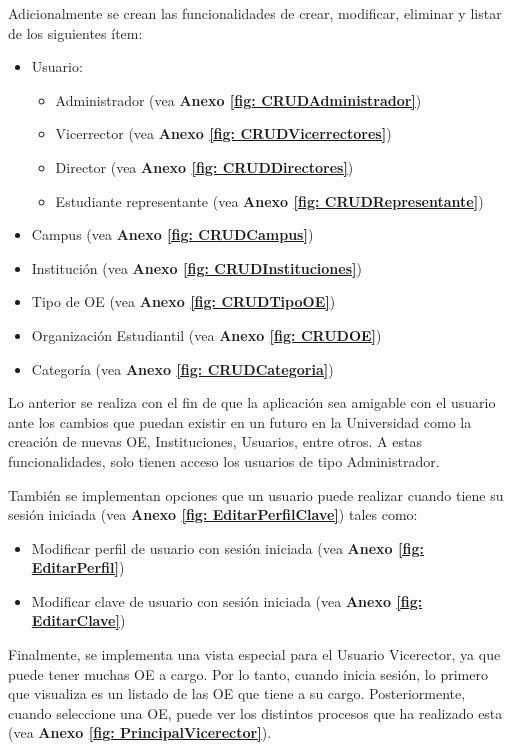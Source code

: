 Adicionalmente se crean las funcionalidades de crear, modificar, eliminar y listar de los siguientes ítem:
\begin{itemize}
    \item Usuario:
    \begin{itemize}
        \item Administrador (vea \textbf{Anexo \ref{fig: CRUDAdministrador}})
        \item Vicerrector (vea \textbf{Anexo \ref{fig: CRUDVicerrectores}})
        \item Director (vea \textbf{Anexo \ref{fig: CRUDDirectores}})
        \item Estudiante representante (vea \textbf{Anexo \ref{fig: CRUDRepresentante}})
    \end{itemize}
    \item Campus (vea \textbf{Anexo \ref{fig: CRUDCampus}})    
    \item Institución (vea \textbf{Anexo \ref{fig: CRUDInstituciones}})    
    \item Tipo de OE (vea \textbf{Anexo \ref{fig: CRUDTipoOE}})
    \item Organización Estudiantil (vea \textbf{Anexo \ref{fig: CRUDOE}})
    \item Categoría (vea \textbf{Anexo \ref{fig: CRUDCategoria}})      
\end{itemize}

Lo anterior se realiza con el fin de que la aplicación sea amigable con el usuario ante los cambios que puedan existir en un futuro en la Universidad como la creación de nuevas OE, Instituciones, Usuarios, entre otros. A estas funcionalidades, solo tienen acceso los usuarios de tipo Administrador.

También se implementan opciones que un usuario puede realizar cuando tiene su sesión iniciada (vea \textbf{Anexo \ref{fig: EditarPerfilClave}}) tales como:
  
\begin{itemize}
    \item Modificar perfil de usuario con sesión iniciada (vea \textbf{Anexo \ref{fig: EditarPerfil}})   
    \item Modificar clave de usuario con sesión iniciada (vea \textbf{Anexo \ref{fig: EditarClave}})  
\end{itemize}

Finalmente, se implementa una vista especial para el Usuario Vicerector, ya que puede tener muchas OE a cargo. Por lo tanto, cuando inicia sesión, lo primero que visualiza es un listado de las OE que tiene a su cargo. Posteriormente, cuando seleccione una OE, puede ver los distintos procesos que ha realizado esta (vea \textbf{Anexo \ref{fig: PrincipalVicerector}}).


